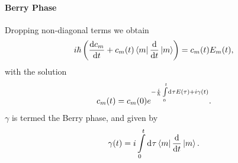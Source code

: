 \paragraph{Berry Phase}
Dropping non-diagonal terms we obtain
\begin{align*}
	i\hbar\left(\dv{c_{m}}{t} + c_{m}(t)\bra{m}\dv{t}\ket{m}\right) = c_{m}(t)E_{m}(t),
\end{align*}
with the solution
\begin{align*}
	c_{m}(t) = c_{m}(0)e^{-\frac{i}{\hbar}\int\limits_{0}^{t}\dd[]{\tau}E(\tau) + i\gamma(t)}.
\end{align*}
$\gamma$ is termed the Berry phase, and given by
\begin{align*}
	\gamma(t) = i\int\limits_{0}^{t}\dd[]{\tau}\bra{m}\dv{t}\ket{m}.
\end{align*}